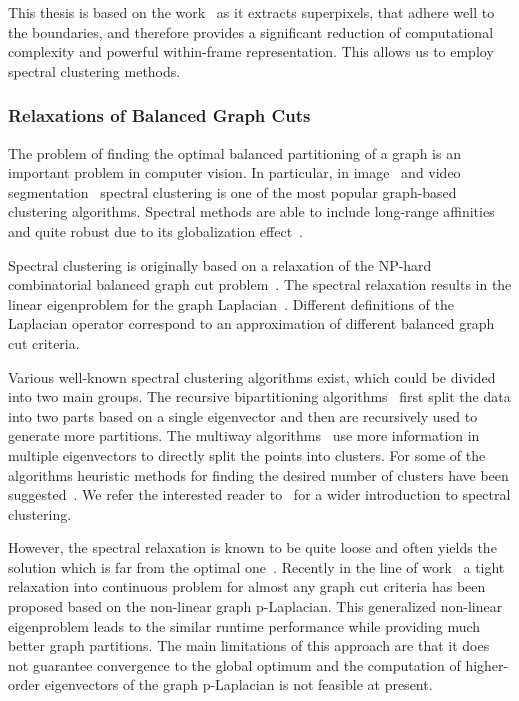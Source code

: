 This thesis is based on the work~\cite{GalassoCS12} as it extracts superpixels, that adhere well to the boundaries, and therefore provides a significant reduction of computational complexity and 
powerful within-frame representation. This allows us to employ spectral clustering methods.%
\subsubsection*{Relaxations of Balanced Graph Cuts}
The problem of finding the optimal balanced partitioning of a graph is an important problem in computer vision. In particular, in image~\cite{Shi00,Arbelaez11} and video 
segmentation~\cite{Brox10,Sundaram11,GalassoCS12,Di12,FragkiadakiZS12} spectral clustering is one of the most popular graph-based clustering algorithms. 
Spectral methods are able to include long-range affinities and quite robust due to its globalization effect~\cite{Fowlkes04}.

Spectral clustering is originally based on a relaxation of the NP-hard combinatorial balanced graph cut problem~\cite{Luxb07}. 
The spectral relaxation results in the linear eigenproblem for the graph Laplacian~\cite{HagenK91,Shi00,Luxb07}. 
Different definitions of the Laplacian operator correspond to an approximation of different balanced graph cut criteria. 

Various well-known spectral clustering algorithms exist, which could be divided into two main groups. 
The recursive bipartitioning algorithms~\cite{Shi00,VempalaV00} first split the data into two parts based on a single eigenvector and then are recursively used to generate more partitions.
The multiway algorithms~\cite{meila01,ng01,yu03,Moore13} use more information in multiple eigenvectors to directly split the points into clusters. For some of the algorithms heuristic methods for finding the desired number of 
clusters have been suggested~\cite{VempalaV00,Shi00,yu03}. We refer the interested reader to~\cite{verma03,Luxb07} for a wider introduction to spectral clustering. 

However, the spectral relaxation is known to be quite loose and often yields the solution which is far from the optimal one~\cite{guattery1998}. Recently in the line of work~\cite{Buhler09,SzlamB10,Hein10,HeinS11} a tight 
relaxation into continuous problem for almost any graph cut criteria has been proposed based on the non-linear graph p-Laplacian. This generalized non-linear eigenproblem leads to the similar runtime performance while providing 
much better graph partitions. The main limitations of this approach are that it does not guarantee convergence to the global optimum and the computation of higher-order eigenvectors of the graph p-Laplacian is not feasible at present.

